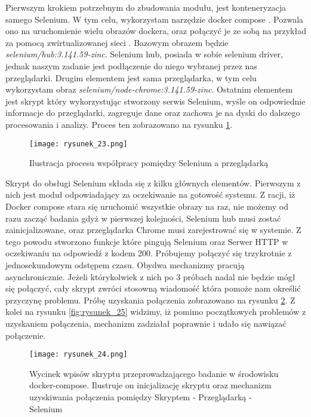 Pierwszym krokiem potrzebnym do zbudowania modułu, jest konteneryzacja samego Selenium.
W tym celu, wykorzystam narzędzie docker compose \cite{docker-compose}.
Pozwala ono na uruchomienie wielu obrazów dockera, oraz połączyć je ze sobą na przykład za pomocą zwirtualizowanej sieci \cite{docker-compose-network}.
Bazowym obrazem będzie \emph{selenium/hub:3.141.59-zinc}.
Selenium hub, posiada w sobie selenium driver, jednak naszym zadanie jest podłączenie do niego wybranej przez nas przeglądarki.
Drugim elementem jest sama przeglądarka, w tym celu wykorzystam obraz \emph{selenium/node-chrome:3.141.59-zinc}.
Ostatnim elementem jest skrypt który wykorzystując stworzony serwis Selenium, wyśle on odpowiednie informacje do przeglądarki,
zagreguje dane oraz zachowa je na dyski do dalszego procesowania i analizy. Proces ten zobrazowano na rysunku \ref{fig:rysunek_23}.

\begin{figure}[!ht]
    \centering
    \texttt{[image: rysunek\_23.png]}
    \caption{Ilustracja procesu współpracy pomiędzy Selenium a przeglądarką}
    \label{fig:rysunek_23}
\end{figure}

Skrypt do obsługi Selenium składa się z kilku głównych elementów. Pierwszym z nich jest moduł odpowiadający za oczekiwanie na gotowość systemu.
Z racji, iż Docker compose stara się uruchomić wszystkie obrazy na raz, nie możemy od razu zacząć badania gdyż w pierwszej kolejności,
Selenium hub musi zostać zainicjalizowane, oraz przeglądarka Chrome musi zarejestrować się w systemie.
Z tego powodu stworzono funkcje które pingują Selenium oraz Serwer HTTP w oczekiwaniu na odpowiedź z kodem 200.
Próbujemy połączyć się trzykrotnie z jednosekundowym odstępem czasu. Obydwa mechanizmy pracują asynchronicznie.
Jeżeli którykolwiek z nich po 3 próbach nadal nie będzie mógł się połączyć, cały skrypt zwróci stosowną wiadomość która pomoże nam określić przyczynę problemu.
Próbę uzyskania połączenia zobrazowano na rysunku \ref{fig:rysunek_24}.
Z kolei na rysunku \ref{fig:rysunek_25} widzimy, iż pomimo początkowych problemów z uzyskaniem połączenia, mechanizm zadziałał poprawnie i udało się nawiązać połączenie.

\begin{figure}[!ht]
    \centering
    \texttt{[image: rysunek\_24.png]}
    \caption{Wycinek wpisów skryptu przeprowadzającego badanie w środowisku docker-compose. Ilustruje on inicjalizację skryptu oraz mechanizm uzyskiwania połączenia pomiędzy Skryptem - Przeglądarką - Selenium}
    \label{fig:rysunek_24}
\end{figure}

